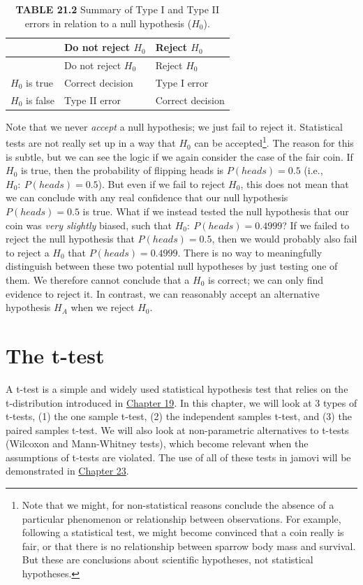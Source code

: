\documentclass[
  openany]{krantz}
\begin{document}
\begin{longtable}[]{@{}lll@{}}
\caption{\textbf{TABLE 21.2} Summary of Type I and Type II errors in relation to a null hypothesis (\(H_{0}\)).}\tabularnewline
\toprule
& Do not reject \(H_{0}\) & Reject \(H_{0}\) \\
\midrule
\endfirsthead
\toprule
& Do not reject \(H_{0}\) & Reject \(H_{0}\) \\
\midrule
\endhead
\(H_{0}\) is true & Correct decision & Type I error \\
\(H_{0}\) is false & Type II error & Correct decision \\
\bottomrule
\end{longtable}

Note that we never \emph{accept} a null hypothesis; we just fail to reject it.
Statistical tests are not really set up in a way that \(H_{0}\) can be accepted\footnote{Note that we might, for non-statistical reasons conclude the absence of a particular phenomenon or relationship between observations. For example, following a statistical test, we might become convinced that a coin really is fair, or that there is no relationship between sparrow body mass and survival. But these are conclusions about scientific hypotheses, not statistical hypotheses.}.
The reason for this is subtle, but we can see the logic if we again consider the case of the fair coin.
If \(H_{0}\) is true, then the probability of flipping heads is \(P(heads) = 0.5\) (i.e., \(H_{0}:\:P(heads) = 0.5\)).
But even if we fail to reject \(H_{0}\), this does not mean that we can conclude with any real confidence that our null hypothesis \(P(heads) = 0.5\) is true.
What if we instead tested the null hypothesis that our coin was \emph{very slightly} biased, such that \(H_{0}:\:P(heads) = 0.4999\)?
If we failed to reject the null hypothesis that \(P(heads) = 0.5\), then we would probably also fail to reject a \(H_{0}\) that \(P(heads) = 0.4999\).
There is no way to meaningfully distinguish between these two potential null hypotheses by just testing one of them.
We therefore cannot conclude that a \(H_{0}\) is correct; we can only find evidence to reject it.
In contrast, we can reasonably accept an alternative hypothesis \(H_{A}\) when we reject \(H_{0}\).

\hypertarget{Chapter_22}{%
\chapter{The t-test}\label{Chapter_22}}

A t-test is a simple and widely used statistical hypothesis test that relies on the t-distribution introduced in \protect\hyperlink{Chapter_19}{Chapter 19}.
In this chapter, we will look at 3 types of t-tests, (1) the one sample t-test, (2) the independent samples t-test, and (3) the paired samples t-test.
We will also look at non-parametric alternatives to t-tests (Wilcoxon and Mann-Whitney tests), which become relevant when the assumptions of t-tests are violated.
The use of all of these tests in jamovi will be demonstrated in \protect\hyperlink{Chapter_23}{Chapter 23}.
\end{document}
